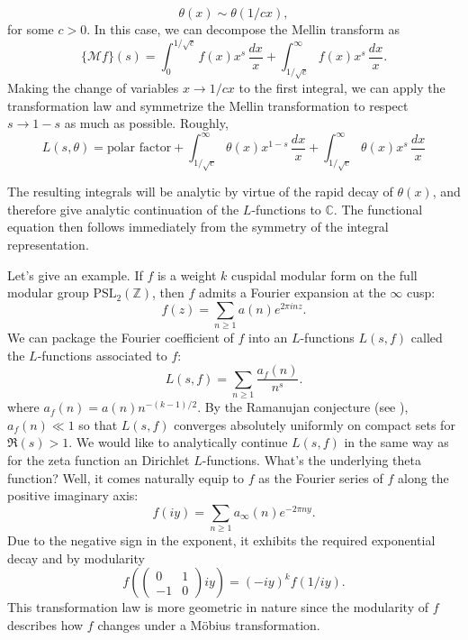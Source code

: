 \documentclass[12pt,reqno]{amsart}
\theoremstyle{definition}
\numberwithin{equation}{section}
\newcommand{\C}{{\mathbb C}}
\newcommand{\Z}{{\mathbb Z}}
\begin{document}
    \[
        \theta(x) \sim \theta\left(1/cx\right),
    \]
    for some $c > 0$. In this case, we can decompose the Mellin transform as
    \[
      \{\mathcal{M}f\}(s) = \int_{0}^{1/\sqrt{c}}f(x)x^{s}\,\frac{dx}{x}+\int_{1/\sqrt{c}}^{\infty}f(x)x^{s}\,\frac{dx}{x}.
    \]
    Making the change of variables $x \to 1/cx$ to the first integral, we can apply the transformation law and symmetrize the Mellin transformation to respect $s \to 1-s$ as much as possible. Roughly,
    \[
        L(s,\theta) = \text{polar factor}+\int_{1/\sqrt{c}}^{\infty}\theta(x)x^{1-s}\,\frac{dx}{x}+\int_{1/\sqrt{c}}^{\infty}\theta(x)x^{s}\,\frac{dx}{x}
    \]
    
    The resulting integrals will be analytic by virtue of the rapid decay of $\theta(x)$, and therefore give analytic continuation of the $L$-functions to $\C$. The functional equation then follows immediately from the symmetry of the integral representation.

    Let's give an example. If $f$ is a weight $k$ cuspidal modular form on the full modular group $\mathrm{PSL}_{2}(\Z)$, then $f$ admits a Fourier expansion at the $\infty$ cusp:
    \[
        f(z) = \sum_{n \ge 1}a(n)e^{2\pi inz}.
    \]
    We can package the Fourier coefficient of $f$ into an $L$-functions $L(s,f)$ called the $L$-functions associated to $f$:
    \[
        L(s,f) = \sum_{n \ge 1}\frac{a_{f}(n)}{n^{s}}.
    \]
    where $a_{f}(n) = a(n)n^{-(k-1)/2}$. By the Ramanujan conjecture (see \cite{D}), $a_{f}(n) \ll 1$ so that $L(s,f)$ converges absolutely uniformly on compact sets for $\Re(s) > 1$. We would like to analytically continue $L(s,f)$ in the same way as for the zeta function an Dirichlet $L$-functions. What's the underlying theta function? Well, it comes naturally equip to $f$ as the Fourier series of $f$ along the positive imaginary axis:
    \[
        f(iy) = \sum_{n \ge 1}a_{\infty}(n)e^{-2\pi ny}.
    \]
    Due to the negative sign in the exponent, it exhibits the required exponential decay and by modularity
    \[
        f\left(\begin{pmatrix} 0 & 1 \\ -1 & 0 \end{pmatrix}iy\right) = (-iy)^{k}f\left(1/iy\right).
    \]
    This transformation law is more geometric in nature since the modularity of $f$ describes how $f$ changes under a M\"obius transformation.
\end{document}
